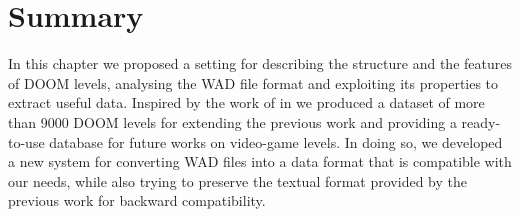 \newpage
\section{Summary}
In this chapter we proposed a setting for describing the structure and the features of DOOM levels, analysing the WAD file format and exploiting its properties to extract useful data. Inspired by the work of \citeauthor{VGLC} in  we produced a dataset of more than 9000 DOOM levels for extending the previous work and providing a ready-to-use database for future works on video-game levels. In doing so, we developed a new system for converting WAD files into a data format that is compatible with our needs, while also trying to preserve the textual format provided by the previous work for backward compatibility. 